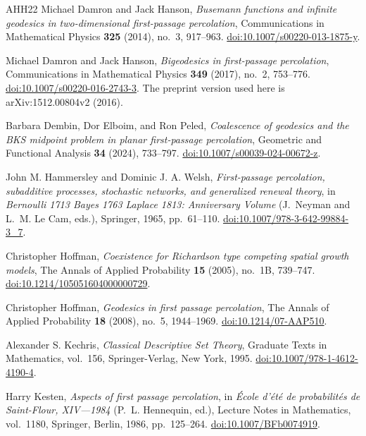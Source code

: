 \begin{thebibliography}{AHH22}
Michael Damron and Jack Hanson,
\emph{Busemann functions and infinite geodesics in two-dimensional first-passage percolation},
Communications in Mathematical Physics \textbf{325} (2014), no.~3, 917--963.
\href{https://doi.org/10.1007/s00220-013-1875-y}{doi:10.1007/s00220-013-1875-y}.

Michael Damron and Jack Hanson,
\emph{Bigeodesics in first-passage percolation},
Communications in Mathematical Physics \textbf{349} (2017), no.~2, 753--776.
\href{https://doi.org/10.1007/s00220-016-2743-3}{doi:10.1007/s00220-016-2743-3}.
The preprint version used here is arXiv:1512.00804v2 (2016).

Barbara Dembin, Dor Elboim, and Ron Peled,
\emph{Coalescence of geodesics and the BKS midpoint problem in planar first-passage percolation},
Geometric and Functional Analysis \textbf{34} (2024), 733--797.
\href{https://doi.org/10.1007/s00039-024-00672-z}{doi:10.1007/s00039-024-00672-z}.

John M. Hammersley and Dominic J. A. Welsh,
\emph{First-passage percolation, subadditive processes, stochastic networks, and generalized renewal theory},
in \emph{Bernoulli 1713 Bayes 1763 Laplace 1813: Anniversary Volume}
(J.~Neyman and L.~M. Le Cam, eds.), Springer, 1965, pp.~61--110.
\href{https://doi.org/10.1007/978-3-642-99884-3_7}{doi:10.1007/978-3-642-99884-3\_7}.

Christopher Hoffman,
\emph{Coexistence for Richardson type competing spatial growth models},
The Annals of Applied Probability \textbf{15} (2005), no.~1B, 739--747.
\href{https://doi.org/10.1214/105051604000000729}{doi:10.1214/105051604000000729}.

Christopher Hoffman,
\emph{Geodesics in first passage percolation},
The Annals of Applied Probability \textbf{18} (2008), no.~5, 1944--1969.
\href{https://doi.org/10.1214/07-AAP510}{doi:10.1214/07-AAP510}.

Alexander S. Kechris,
\emph{Classical Descriptive Set Theory},
Graduate Texts in Mathematics, vol.~156,
Springer-Verlag, New York, 1995.
\href{https://doi.org/10.1007/978-1-4612-4190-4}{doi:10.1007/978-1-4612-4190-4}.

Harry Kesten,
\emph{Aspects of first passage percolation},
in \emph{\'Ecole d'\'et\'e de probabilit\'es de Saint-Flour, XIV---1984}
(P.~L. Hennequin, ed.), Lecture Notes in Mathematics, vol.~1180,
Springer, Berlin, 1986, pp.~125--264.
\href{https://doi.org/10.1007/BFb0074919}{doi:10.1007/BFb0074919}.


\end{thebibliography}
